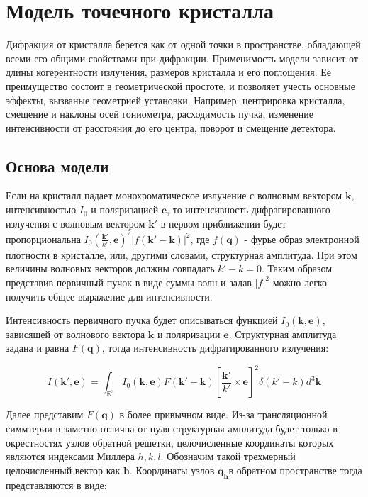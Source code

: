 \documentclass[12pt]{article}
\begin{document}
\section*{Модель точечного кристалла}

Дифракция от кристалла берется как от одной точки в пространстве,
обладающей всеми его общими свойствами при дифракции.
Применимость модели зависит от длины когерентности излучения,
размеров кристалла и его поглощения.
Ее преимущество состоит в геометрической простоте, и позволяет
учесть основные эффекты, вызваные геометрией установки.
Например: центрировка кристалла, смещение и наклоны осей гониометра,
расходимость пучка, изменение интенсивности от расстояния до его центра,
поворот и смещение детектора.

\subsection*{Основа модели}

Если на кристалл падает монохроматическое излучение с волновым вектором
$\pmb{k}$, интенсивностью $I_0$ и поляризацией $\pmb{e}$, то интенсивность
дифрагированного излучения с волновым вектором $\pmb{k}'$ в первом приближении будет
пропорциональна $I_0 (\frac{\pmb{k}'}{k'}, \pmb{e})^2 |f(\pmb{k}' - \pmb{k})|^2$, где
$f(\pmb{q})$ - фурье образ электронной плотности в кристалле, или, другими словами,
структурная амплитуда. При этом величины волновых векторов должны совпадать $k' - k = 0$.
Таким образом представив первичный пучок в виде суммы волн и задав $|f|^2$ можно
легко получить общее выражение для интенсивности.

Интенсивность первичного пучка будет описываться функцией
$I_0(\pmb{k}, \pmb{e})$, зависящей от
волнового вектора $\pmb{k}$ и поляризации $\pmb{e}$. Структурная амплитуда
задана и равна $F(\pmb{q})$, тогда интенсивность дифрагированного излучения:

\[I(\pmb{k}', \pmb{e}) = \int_{\mathbb{R}^3} I_0(\pmb{k}, \pmb{e}) F(\pmb{k}' - \pmb{k})
\left[\frac{\pmb{k}'}{k'} \times \pmb{e}\right]^2 \delta(k' - k) d^3 \pmb{k}\]

Далее представим $F(\pmb{q})$ в более привычном виде. Из-за трансляционной
симмтерии в заметно отлична от нуля структурная амплитуда будет только
в окрестностях узлов обратной решетки, целочисленные координаты которых
являются индексами Миллера $h, k, l$. Обозначим такой трехмерный целочисленный
вектор как $\pmb{h}$. Координаты узлов $\pmb{q_h}$в обратном пространстве тогда
представляются в виде:
\end{document}
